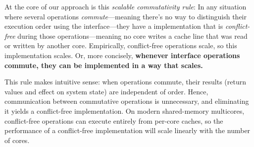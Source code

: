 

At the core of our approach is this \emph{scalable commutativity
  rule}: In any situation where several operations
\emph{commute}---meaning there's no way to distinguish their execution
order using the interface---they have a implementation that is
\emph{conflict-free} during those operations---meaning no core
writes a cache line that was read or written by another core.
%
Empirically, conflict-free operations scale, so this implementation
scales.
%
Or, more concisely, \textbf{whenever interface operations commute,
  they can be implemented in a way that scales.}

This rule makes intuitive sense: when operations commute, their
results (return values and effect on system state) are independent of
order.  Hence, communication between commutative operations is
unnecessary, and eliminating it yields a conflict-free implementation.
%
On modern shared-memory multicores, conflict-free operations can
execute entirely from per-core caches, so the performance of
a conflict-free implementation will scale linearly with the number of
cores.

